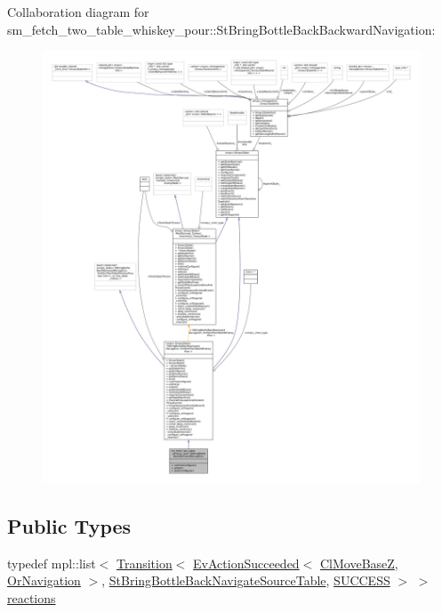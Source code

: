 Collaboration diagram for sm\+\_\+fetch\+\_\+two\+\_\+table\+\_\+whiskey\+\_\+pour\+:\+:St\+Bring\+Bottle\+Back\+Backward\+Navigation\+:
\nopagebreak
\begin{figure}[H]
\begin{center}
\leavevmode
\includegraphics[width=350pt]{structsm__fetch__two__table__whiskey__pour_1_1StBringBottleBackBackwardNavigation__coll__graph}
\end{center}
\end{figure}
\subsection*{Public Types}
\begin{DoxyCompactItemize}
\item 
typedef mpl\+::list$<$ \hyperlink{classsmacc_1_1Transition}{Transition}$<$ \hyperlink{structsmacc_1_1default__events_1_1EvActionSucceeded}{Ev\+Action\+Succeeded}$<$ \hyperlink{classcl__move__base__z_1_1ClMoveBaseZ}{Cl\+Move\+BaseZ}, \hyperlink{classsm__fetch__two__table__whiskey__pour_1_1OrNavigation}{Or\+Navigation} $>$, \hyperlink{structsm__fetch__two__table__whiskey__pour_1_1StBringBottleBackNavigateSourceTable}{St\+Bring\+Bottle\+Back\+Navigate\+Source\+Table}, \hyperlink{structsmacc_1_1default__transition__tags_1_1SUCCESS}{S\+U\+C\+C\+E\+SS} $>$ $>$ \hyperlink{structsm__fetch__two__table__whiskey__pour_1_1StBringBottleBackBackwardNavigation_ad58993939ee0666c179cc3bcc4a1f1fc}{reactions}
\end{DoxyCompactItemize}

